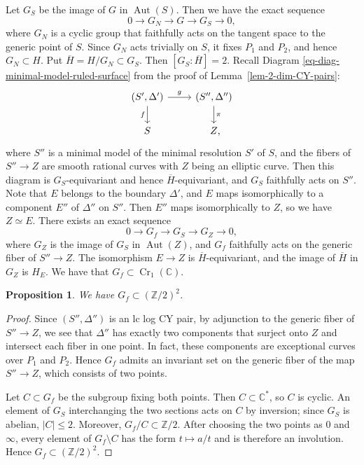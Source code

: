 \documentclass[11pt]{amsart}
\numberwithin{equation}{section}
\newtheorem{proposition}[thm]{Proposition}
\theoremstyle{definition}
\theoremstyle{remark}
\newcommand{\lra}{\longrightarrow}
\DeclareMathOperator{\Cr}{Cr}
\DeclareMathOperator{\Aut}{Aut}
\begin{document}
Let $G_S$ be the image of $G$ in $\Aut(S)$. Then we have the  exact sequence
\begin{equation}
\label{eq-exact-seq1}
0\lra G_N \lra G \lra G_S \lra 0, 
\end{equation}
where $G_N$ is a cyclic group that faithfully acts on the tangent space to the generic point of $S$. 
Since $G_N$ acts trivially on $S$, it fixes $P_1$ and $P_2$, and hence $G_N\subset H$. Put $\overline H=H/G_N\subset G_S$. Then $[G_S:\overline H]=2$.
Recall Diagram \eqref{eq-diag-minimal-model-ruled-surface} from the proof of Lemma~\ref{lem-2-dim-CY-pairs}:
\begin{equation}
\label{eq-one-more-diagram}
\begin{tikzcd}
(S',\Delta')  \arrow{r}{g} \arrow[swap]{d}{f} & (S'', \Delta'') \arrow{d}{\pi} \\
S & Z\rlap{,}
\end{tikzcd}
\end{equation}
where $S''$ is a minimal model of the minimal resolution $S'$ of $S$, and the fibers of $S''\to Z$ are smooth rational curves with $Z$ being an elliptic curve. 
Then this diagram is $G_S$-equivariant and hence $\overline H$-equivariant, and $G_S$ faithfully acts on $S''$. 
Note that $E$ belongs to the boundary $\Delta'$, and $E$ maps isomorphically to a component $E''$ of $\Delta''$ on $S''$. Then $E''$ maps isomorphically to $Z$, so we have $Z\simeq E$. 
There exists an exact sequence
\begin{equation}
\label{eq-exact-seq2}
0\lra G_f \lra G_S \lra G_Z \lra 0, 
\end{equation}
where $G_Z$ is the image of $G_S$ in $\Aut(Z)$, and $G_f$ faithfully acts on the generic fiber of $S''\to Z$.
The isomorphism $E\to Z$ is $\overline H$-equivariant, and the image of $\overline H$ in $G_Z$ is $H_E$.
We have that $G_f\subset \Cr_1(\mathbb{C})$.

\begin{proposition}
\label{prop-G-f}
We have $G_f\subset (\mathbb{Z}/2)^2$.
\end{proposition}

\begin{proof} 
Since $(S'', \Delta'')$ is an lc log CY pair, by adjunction to the generic fiber of $S''\to Z$, we see that $\Delta''$ has exactly two components that surject onto $Z$ and intersect each fiber in one point. In fact, these components are exceptional curves over $P_1$ and $P_2$.
Hence $G_f$ admits an invariant set on the generic fiber of the map $S''\to Z$, which consists of two points. 

Let $C\subset G_f$ be the subgroup fixing both points. Then
$C\subset\mathbb C^*$, so $C$ is cyclic. An element of $G_S$
interchanging the two sections acts on $C$ by inversion; since $G_S$
is abelian, $|C|\leq2$. Moreover, $G_f/C\subset\mathbb Z/2$. After
choosing the two points as $0$ and $\infty$, every element of
$G_f\setminus C$ has the form $t\mapsto a/t$ and is therefore an
involution. Hence
$G_f\subset(\mathbb Z/2)^2$.
\color{black}
\end{proof}
\end{document}
